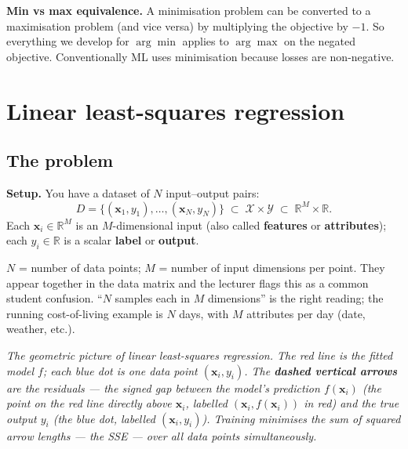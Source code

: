\documentclass[11pt, a4paper]{article}
\begin{document}
\textbf{Min vs max equivalence.} A minimisation problem can be converted to a maximisation problem (and vice versa) by multiplying the objective by $-1$. So everything we develop for $\arg\min$ applies to $\arg\max$ on the negated objective. Conventionally ML uses minimisation because losses are non-negative.

\section{Linear least-squares regression}

\subsection{The problem}

\textbf{Setup.} You have a dataset of $N$ input--output pairs:
\[
D = \{(\mathbf{x}_1, y_1), \ldots, (\mathbf{x}_N, y_N)\} \;\subset\; \mathcal{X}\times\mathcal{Y} \;\subset\; \mathbb{R}^M \times \mathbb{R}.
\]
Each $\mathbf{x}_i \in \mathbb{R}^M$ is an $M$-dimensional input (also called \textbf{features} or \textbf{attributes}); each $y_i \in \mathbb{R}$ is a scalar \textbf{label} or \textbf{output}.

\begin{pitfallbox}
$N$ = number of data points; $M$ = number of input dimensions per point. They appear together in the data matrix and the lecturer flags this as a common student confusion. ``$N$ samples each in $M$ dimensions'' is the right reading; the running cost-of-living example is $N$ days, with $M$ attributes per day (date, weather, etc.).
\end{pitfallbox}

\begin{center}

\footnotesize\textit{The geometric picture of linear least-squares regression. The red line is the fitted model $f$; each blue dot is one data point $(\mathbf{x}_i, y_i)$. The \textbf{dashed vertical arrows} are the residuals --- the signed gap between the model's prediction $f(\mathbf{x}_i)$ (the point on the red line directly above $\mathbf{x}_i$, labelled $(\mathbf{x}_i, f(\mathbf{x}_i))$ in red) and the true output $y_i$ (the blue dot, labelled $(\mathbf{x}_i, y_i)$). Training minimises the \emph{sum of squared} arrow lengths --- the SSE --- over all data points simultaneously.}
\end{center}
\end{document}
